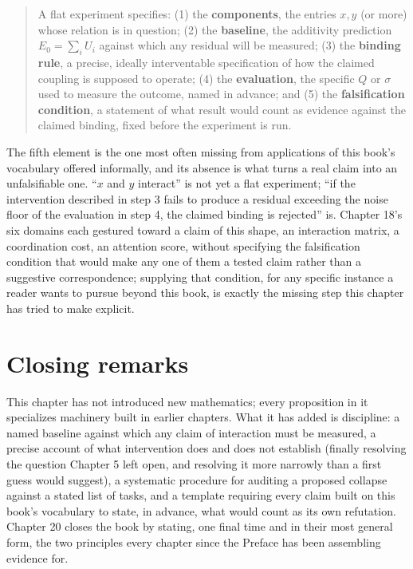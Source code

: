 \documentclass[11pt]{book}
\begin{document}
\begin{quote}
A flat experiment specifies: (1) the \textbf{components}, the entries $x,y$ (or more) whose relation is in question; (2) the \textbf{baseline}, the additivity prediction $E_0=\sum_iU_i$ against which any residual will be measured; (3) the \textbf{binding rule}, a precise, ideally interventable specification of how the claimed coupling is supposed to operate; (4) the \textbf{evaluation}, the specific $Q$ or $\sigma$ used to measure the outcome, named in advance; and (5) the \textbf{falsification condition}, a statement of what result would count as evidence against the claimed binding, fixed before the experiment is run.
\end{quote}

The fifth element is the one most often missing from applications of this book's vocabulary offered informally, and its absence is what turns a real claim into an unfalsifiable one. ``$x$ and $y$ interact'' is not yet a flat experiment; ``if the intervention described in step 3 fails to produce a residual exceeding the noise floor of the evaluation in step 4, the claimed binding is rejected'' is. Chapter 18's six domains each gestured toward a claim of this shape, an interaction matrix, a coordination cost, an attention score, without specifying the falsification condition that would make any one of them a tested claim rather than a suggestive correspondence; supplying that condition, for any specific instance a reader wants to pursue beyond this book, is exactly the missing step this chapter has tried to make explicit.

\section{Closing remarks}

This chapter has not introduced new mathematics; every proposition in it specializes machinery built in earlier chapters. What it has added is discipline: a named baseline against which any claim of interaction must be measured, a precise account of what intervention does and does not establish (finally resolving the question Chapter 5 left open, and resolving it more narrowly than a first guess would suggest), a systematic procedure for auditing a proposed collapse against a stated list of tasks, and a template requiring every claim built on this book's vocabulary to state, in advance, what would count as its own refutation. Chapter 20 closes the book by stating, one final time and in their most general form, the two principles every chapter since the Preface has been assembling evidence for.
\end{document}
